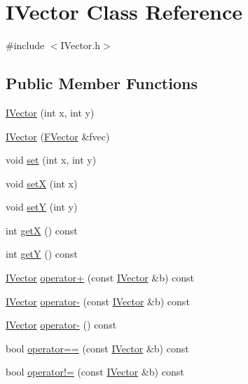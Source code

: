 \hypertarget{class_i_vector}{\section{I\+Vector Class Reference}
\label{class_i_vector}
}


{\ttfamily \#include $<$I\+Vector.\+h$>$}

\subsection*{Public Member Functions}
\begin{DoxyCompactItemize}
\item 
\hyperlink{class_i_vector_adeabc4b0f4932cda5b4c8040da2dfc62}{I\+Vector} (int x, int y)
\item 
\hyperlink{class_i_vector_a28fc0ca78c5f7d7b241a5225396f8da5}{I\+Vector} (\hyperlink{class_f_vector}{F\+Vector} \&fvec)
\item 
void \hyperlink{class_i_vector_a6dce9a639a609e28bb0f814c1e2cf82e}{set} (int x, int y)
\item 
void \hyperlink{class_i_vector_a2256218449a4ff6df57cdb41fb09877f}{set\+X} (int x)
\item 
void \hyperlink{class_i_vector_a7e70cc0470077112cac352086f8ab500}{set\+Y} (int y)
\item 
int \hyperlink{class_i_vector_a255464399d9901bc2efc3b197b380b0e}{get\+X} () const 
\item 
int \hyperlink{class_i_vector_a2bf064a07ecf6912cf9e7bd44ad12073}{get\+Y} () const 
\item 
\hyperlink{class_i_vector}{I\+Vector} \hyperlink{class_i_vector_a6700c03ecc1e857a78b2066f39a018d5}{operator+} (const \hyperlink{class_i_vector}{I\+Vector} \&b) const 
\item 
\hyperlink{class_i_vector}{I\+Vector} \hyperlink{class_i_vector_a275b2a8da268c5df8f74f36c950c1236}{operator-\/} (const \hyperlink{class_i_vector}{I\+Vector} \&b) const 
\item 
\hyperlink{class_i_vector}{I\+Vector} \hyperlink{class_i_vector_a0115772afbf7ab7e986881353539759d}{operator-\/} () const 
\item 
bool \hyperlink{class_i_vector_a8cf7d091e70efc188b3f04e1aa9ab439}{operator==} (const \hyperlink{class_i_vector}{I\+Vector} \&b) const 
\item 
bool \hyperlink{class_i_vector_ab29fc9f9cd118682d086110f30273cf5}{operator!=} (const \hyperlink{class_i_vector}{I\+Vector} \&b) const 
\end{DoxyCompactItemize}


